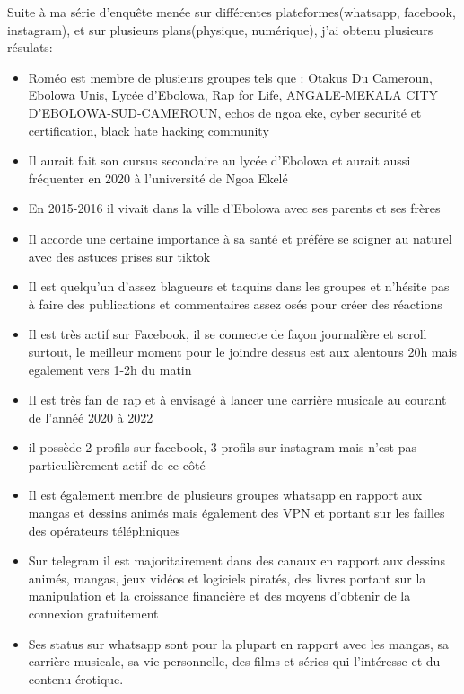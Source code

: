 \documentclass[french]{article}
\begin{document}
Suite à ma série d'enquête menée sur différentes plateformes(whatsapp, facebook, instagram), et sur plusieurs plans(physique, numérique), j'ai obtenu plusieurs résulats:
  \begin{itemize}
  \item Roméo est membre de plusieurs groupes tels que : Otakus Du Cameroun, Ebolowa Unis, Lycée d'Ebolowa, Rap for Life, ANGALE-MEKALA CITY D'EBOLOWA-SUD-CAMEROUN, echos de ngoa eke, cyber securité et certification, black hate hacking community
  \item Il aurait fait son cursus secondaire au lycée d'Ebolowa et aurait aussi fréquenter en 2020 à l'université de Ngoa Ekelé
  \item En 2015-2016 il vivait dans la ville d'Ebolowa avec ses parents et ses frères
  \item Il accorde une certaine importance à sa santé et préfére se soigner au naturel avec des astuces prises sur tiktok
  \item Il est quelqu'un d'assez blagueurs et taquins dans les groupes et n'hésite pas à faire des publications et commentaires assez osés pour créer des réactions
  \item Il est très actif sur Facebook, il se connecte de façon journalière et scroll surtout, le meilleur moment pour le joindre dessus est aux alentours 20h mais egalement vers 1-2h du matin
  \item Il est très fan de rap et à envisagé à lancer une carrière musicale au courant de l'annéé 2020 à 2022
  \item il possède  2 profils sur facebook, 3 profils sur instagram mais n'est pas particulièrement actif de ce côté
  \item Il est également membre de plusieurs groupes whatsapp en rapport aux mangas et dessins animés mais également des VPN et portant sur les failles des opérateurs téléphniques
  \item Sur telegram il est majoritairement dans des canaux en rapport aux dessins animés, mangas, jeux vidéos et logiciels piratés, des livres portant sur la manipulation et la croissance financière et des moyens d'obtenir de la connexion gratuitement
  \item Ses status sur whatsapp sont pour la plupart en rapport avec les mangas, sa carrière musicale, sa vie personnelle,  des films et séries qui l'intéresse et du contenu érotique.
    \end{itemize}
\end{document}
